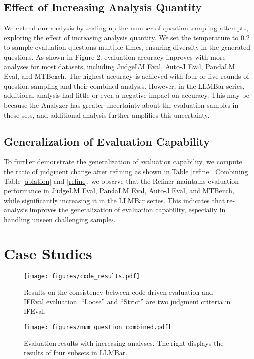 \subsection{Effect of Increasing Analysis Quantity}\label{effect_q}

We extend our analysis by scaling up the number of question sampling attempts, exploring the effect of increasing analysis quantity. We set the temperature to 0.2 to sample evaluation questions multiple times, ensuring diversity in the generated questions. As shown in Figure \ref{num_questions}, evaluation accuracy improves with more analyses for most datasets, including JudgeLM Eval, Auto-J Eval, PandaLM Eval, and MTBench. The highest accuracy is achieved with four or five rounds of question sampling and their combined analysis. However, in the LLMBar series, additional analysis had little or even a negative impact on accuracy. This may be because the Analyzer has greater uncertainty about the evaluation samples in these sets, and additional analysis further amplifies this uncertainty.

\subsection{Generalization of Evaluation Capability}\label{effect_refine}

To further demonstrate the generalization of evaluation capability, we compute the ratio of judgment change after refining as shown in Table \ref{refine}. Combining Table \ref{ablation} and \ref{refine}, we observe that the Refiner maintains evaluation performance in JudgeLM Eval, PandaLM Eval, Auto-J Eval, and MTBench, while significantly increasing it in the LLMBar series. This indicates that re-analysis improves the generalization of evaluation capability, especially in handling unseen challenging samples.

\section{Case Studies}

\begin{figure}[t!]
	\centering
	\texttt{[image: figures/code\_results.pdf]}
	\caption{Results on the consistency between code-driven evaluation and IFEval evaluation. ``Loose'' and ``Strict'' are two judgment criteria in IFEval.}
	\label{code_eval}
\end{figure}

\begin{figure}[t!]
	\centering
	\texttt{[image: figures/num\_question\_combined.pdf]}
	\caption{Evaluation results with increasing analyses. The right displays the results of four subsets in LLMBar.}
	\label{num_questions}
\end{figure}

